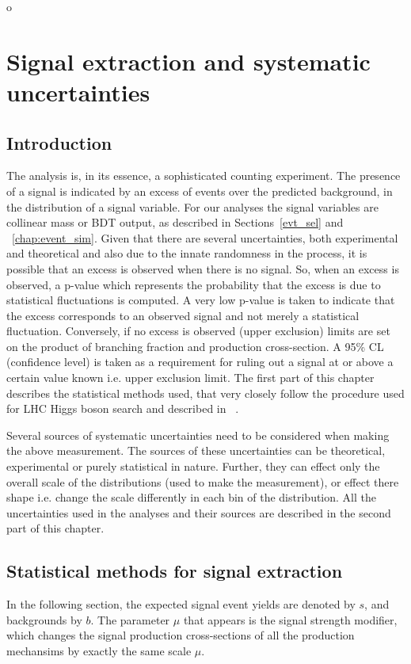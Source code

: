 
%
o%

\chapter{Signal extraction and systematic uncertainties}
\label{sig_ext}
\section{Introduction}
The analysis is, in its essence, a sophisticated counting experiment. The presence of a signal is indicated by an excess of events over the predicted background, in the distribution of a signal variable. For our analyses the signal variables are collinear mass or BDT output, as described in Sections~\ref{evt_sel} and ~\ref{chap:event_sim}. Given that there are several uncertainties, both experimental and theoretical and also due to the innate randomness in the process, it is possible that an excess is observed when there is no signal. So, when an excess is observed, a p-value which represents the probability that the excess is due to statistical fluctuations is computed. A very low p-value is taken to indicate that the excess corresponds to an observed signal and not merely a statistical fluctuation. Conversely, if no excess is observed (upper exclusion) limits are set on the product of branching fraction and production cross-section. A 95\% CL (confidence level) is taken as a requirement for ruling out a signal at or above a certain value known i.e. upper exclusion limit. The first part of this chapter describes the statistical methods used, that very closely follow the procedure used for LHC Higgs boson search and described in ~\cite{note2011}.

Several sources of systematic uncertainties need to be considered when making the above measurement. The sources of these uncertainties can be theoretical, experimental or purely statistical in nature. Further, they can effect only the overall scale of the distributions (used to make the measurement), or effect there shape i.e. change the scale differently in each bin of the distribution. All the uncertainties used in the analyses and their sources are described in the second part of this chapter.      



\section{Statistical methods for signal extraction}
In the following section, the expected signal event yields are denoted by $s$, and backgrounds by $b$. The parameter $\mu$ that appears is the signal strength modifier, which changes the signal production cross-sections of all the production mechansims by exactly the same scale $\mu$.
\label{stat_meth}
